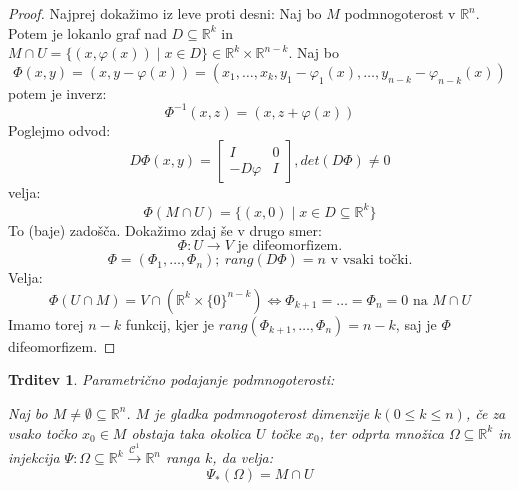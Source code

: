 \documentclass[a4paper, 10pt]{article}
\newtheorem{trditev}{Trditev}
\newcommand{\mth}[1]{\ensuremath{\mathbb{#1}}}
\newcommand{\R}{\mth{R}}
\newcommand{\con}{\ensuremath{\mathscr{C}}}
\begin{document}
\begin{proof}

Najprej dokažimo iz leve proti desni:
Naj bo $M$ podmnogoterost v $\R^n$. Potem je lokanlo graf nad $D \subseteq \R^k$ in $M \cap U = \{ (x, \varphi(x)) \mid x \in D\} \in \R^k\times\R^{n-k}$. Naj bo
\[
\Phi(x, y) = (x, y - \varphi(x)) = (x_1, \ldots, x_k, y_1 - \varphi_1(x), \ldots, y_{n-k} - \varphi_{n-k}(x))
\]
potem je inverz:
\[
\Phi^{-1}(x, z) = (x, z + \varphi(x))
\]
Poglejmo odvod:
\[
D\Phi(x, y) = 
\begin{bmatrix}
I & 0 \\
-D\varphi & I
\end{bmatrix}
, det(D\Phi) \neq 0
\]
velja:
\[
\Phi(M \cap U) = \{ (x, 0) \mid x \in D \subseteq \R^k \}
\]
To (baje) zadošča.
Dokažimo zdaj še v drugo smer:
\[
\Phi : U \rightarrow V \text{ je difeomorfizem.}
\]
\[
\Phi = (\Phi_1, \ldots, \Phi_n); ~rang(D\Phi) = n \text{ v vsaki točki.}
\]
Velja:
\[
\Phi(U \cap M) = V \cap (\R^k \times \{0\}^{n-k}) \iff 
\Phi_{k+1} = \ldots = \Phi_n = 0 \text{ na } M \cap U
\]
Imamo torej $n-k$ funkcij, kjer je $rang(\Phi_{k+1}, \ldots, \Phi_n) = n-k$, saj je $\Phi$ difeomorfizem.
\end{proof}

\begin{trditev}
Parametrično podajanje podmnogoterosti:

Naj bo $M \neq \emptyset \subseteq \R^n$. $M$ je gladka podmnogoterost dimenzije $k (0 \leq k \leq n)$, če za vsako točko $x_0 \in M$ obstaja taka okolica $U$ točke $x_0$, ter odprta množica $\Omega \subseteq \R^k$ in injekcija $\Psi: \Omega \subseteq \R^k \xrightarrow{\con^1} \R^n$ ranga $k$, da velja:
\[
\Psi_{\ast}(\Omega) = M \cap U
\]

\end{trditev}
\end{document}
